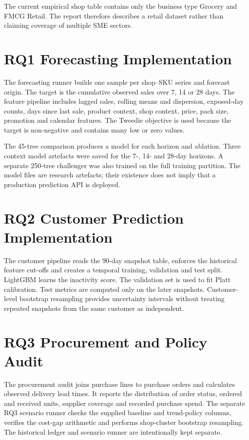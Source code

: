The current empirical shop table contains only the business type Grocery and FMCG Retail. The report therefore describes a retail dataset rather than claiming coverage of multiple SME sectors.

\section{RQ1 Forecasting Implementation}
The forecasting runner builds one sample per shop--SKU series and forecast origin. The target is the cumulative observed sales over 7, 14 or 28 days. The feature pipeline includes lagged sales, rolling means and dispersion, exposed-day counts, days since last sale, product context, shop context, price, pack size, promotion and calendar features. The Tweedie objective is used because the target is non-negative and contains many low or zero values.

The 45-tree comparison produces a model for each horizon and ablation. Three context model artefacts were saved for the 7-, 14- and 28-day horizons. A separate 250-tree challenger was also trained on the full training partition. The model files are research artefacts; their existence does not imply that a production prediction API is deployed.

\section{RQ2 Customer Prediction Implementation}
The customer pipeline reads the 90-day snapshot table, enforces the historical feature cut-offs and creates a temporal training, validation and test split. LightGBM learns the inactivity score. The validation set is used to fit Platt calibration. Test metrics are computed only on the later snapshots. Customer-level bootstrap resampling provides uncertainty intervals without treating repeated snapshots from the same customer as independent.

\section{RQ3 Procurement and Policy Audit}
The procurement audit joins purchase lines to purchase orders and calculates observed delivery lead times. It reports the distribution of order status, ordered and received units, supplier coverage and recorded purchase spend. The separate RQ3 scenario runner checks the supplied baseline and trend-policy columns, verifies the cost-gap arithmetic and performs shop-cluster bootstrap resampling. The historical ledger and scenario runner are intentionally kept separate.

